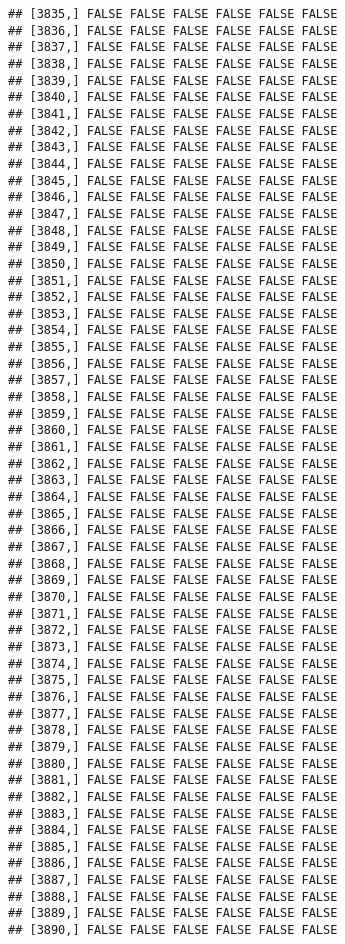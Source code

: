\documentclass[
]{article}
\begin{document}
\begin{verbatim}
## [3835,] FALSE FALSE FALSE FALSE FALSE FALSE
## [3836,] FALSE FALSE FALSE FALSE FALSE FALSE
## [3837,] FALSE FALSE FALSE FALSE FALSE FALSE
## [3838,] FALSE FALSE FALSE FALSE FALSE FALSE
## [3839,] FALSE FALSE FALSE FALSE FALSE FALSE
## [3840,] FALSE FALSE FALSE FALSE FALSE FALSE
## [3841,] FALSE FALSE FALSE FALSE FALSE FALSE
## [3842,] FALSE FALSE FALSE FALSE FALSE FALSE
## [3843,] FALSE FALSE FALSE FALSE FALSE FALSE
## [3844,] FALSE FALSE FALSE FALSE FALSE FALSE
## [3845,] FALSE FALSE FALSE FALSE FALSE FALSE
## [3846,] FALSE FALSE FALSE FALSE FALSE FALSE
## [3847,] FALSE FALSE FALSE FALSE FALSE FALSE
## [3848,] FALSE FALSE FALSE FALSE FALSE FALSE
## [3849,] FALSE FALSE FALSE FALSE FALSE FALSE
## [3850,] FALSE FALSE FALSE FALSE FALSE FALSE
## [3851,] FALSE FALSE FALSE FALSE FALSE FALSE
## [3852,] FALSE FALSE FALSE FALSE FALSE FALSE
## [3853,] FALSE FALSE FALSE FALSE FALSE FALSE
## [3854,] FALSE FALSE FALSE FALSE FALSE FALSE
## [3855,] FALSE FALSE FALSE FALSE FALSE FALSE
## [3856,] FALSE FALSE FALSE FALSE FALSE FALSE
## [3857,] FALSE FALSE FALSE FALSE FALSE FALSE
## [3858,] FALSE FALSE FALSE FALSE FALSE FALSE
## [3859,] FALSE FALSE FALSE FALSE FALSE FALSE
## [3860,] FALSE FALSE FALSE FALSE FALSE FALSE
## [3861,] FALSE FALSE FALSE FALSE FALSE FALSE
## [3862,] FALSE FALSE FALSE FALSE FALSE FALSE
## [3863,] FALSE FALSE FALSE FALSE FALSE FALSE
## [3864,] FALSE FALSE FALSE FALSE FALSE FALSE
## [3865,] FALSE FALSE FALSE FALSE FALSE FALSE
## [3866,] FALSE FALSE FALSE FALSE FALSE FALSE
## [3867,] FALSE FALSE FALSE FALSE FALSE FALSE
## [3868,] FALSE FALSE FALSE FALSE FALSE FALSE
## [3869,] FALSE FALSE FALSE FALSE FALSE FALSE
## [3870,] FALSE FALSE FALSE FALSE FALSE FALSE
## [3871,] FALSE FALSE FALSE FALSE FALSE FALSE
## [3872,] FALSE FALSE FALSE FALSE FALSE FALSE
## [3873,] FALSE FALSE FALSE FALSE FALSE FALSE
## [3874,] FALSE FALSE FALSE FALSE FALSE FALSE
## [3875,] FALSE FALSE FALSE FALSE FALSE FALSE
## [3876,] FALSE FALSE FALSE FALSE FALSE FALSE
## [3877,] FALSE FALSE FALSE FALSE FALSE FALSE
## [3878,] FALSE FALSE FALSE FALSE FALSE FALSE
## [3879,] FALSE FALSE FALSE FALSE FALSE FALSE
## [3880,] FALSE FALSE FALSE FALSE FALSE FALSE
## [3881,] FALSE FALSE FALSE FALSE FALSE FALSE
## [3882,] FALSE FALSE FALSE FALSE FALSE FALSE
## [3883,] FALSE FALSE FALSE FALSE FALSE FALSE
## [3884,] FALSE FALSE FALSE FALSE FALSE FALSE
## [3885,] FALSE FALSE FALSE FALSE FALSE FALSE
## [3886,] FALSE FALSE FALSE FALSE FALSE FALSE
## [3887,] FALSE FALSE FALSE FALSE FALSE FALSE
## [3888,] FALSE FALSE FALSE FALSE FALSE FALSE
## [3889,] FALSE FALSE FALSE FALSE FALSE FALSE
## [3890,] FALSE FALSE FALSE FALSE FALSE FALSE

\end{verbatim}
\end{document}
